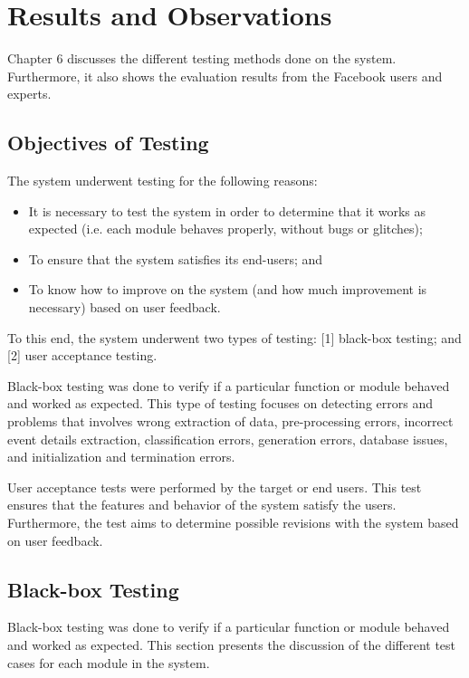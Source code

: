 \chapter{Results and Observations}
\label{sec:resultsandobservations} 

Chapter 6 discusses the different testing methods done on the system. Furthermore, it also shows the evaluation results from the Facebook users and experts.

\section{Objectives of Testing}
The system underwent testing for the following reasons:
\begin{itemize}
	\item It is necessary to test the system in order to determine that it works as expected (i.e. each module behaves properly, without bugs or glitches);
	\item To ensure that the system satisfies its end-users; and
	\item To know how to improve on the system (and how much improvement is necessary) based on user feedback.
\end{itemize}

To this end, the system underwent two types of testing: [1] black-box testing; and [2] user acceptance testing. 

Black-box testing was done to verify if a particular function or module behaved and worked as expected. This type of testing focuses on detecting errors and problems that involves wrong extraction of data, pre-processing errors, incorrect event details extraction, classification errors, generation errors, database issues, and initialization and termination errors. 

User acceptance tests were performed by the target or end users. This test ensures that the features and behavior of the system satisfy the users. Furthermore, the test aims to determine possible revisions with the system based on user feedback.

\section{Black-box Testing}
Black-box testing was done to verify if a particular function or module behaved and worked as expected. This section presents the discussion of the different test cases for each module in the system.

